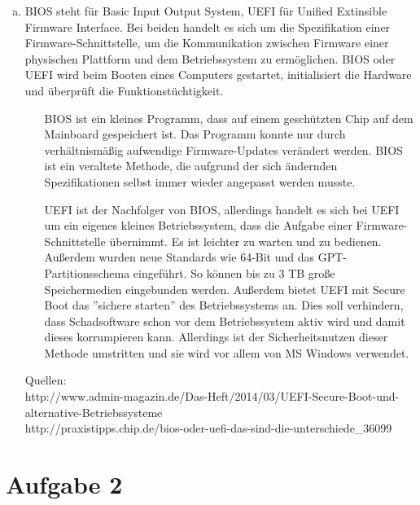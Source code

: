 \documentclass[numbers=noendperiod]{scrartcl}
\begin{document}
\begin{enumerate}[a)]
	\item BIOS steht für Basic Input Output System, UEFI für Unified Extinsible Firmware Interface. 	 Bei beiden handelt es sich um die Spezifikation einer Firmware-Schnittstelle, um die Kommunikation zwischen Firmware einer physischen Plattform und dem Betriebssystem zu ermöglichen. BIOS oder UEFI wird beim Booten eines Computers gestartet, initialisiert die Hardware und überprüft die Funktionstüchtigkeit.
	\begin{enumerate}
		\item[BIOS] ist ein kleines Programm, dass auf einem geschützten Chip auf dem Mainboard gespeichert ist. Das Programm konnte nur durch verhältnismäßig aufwendige Firmware-Updates verändert werden. BIOS ist ein veraltete Methode, die aufgrund der sich ändernden Spezifikationen selbst immer wieder angepasst werden musste.
		\item[UEFI] ist der Nachfolger von BIOS, allerdings handelt es sich bei UEFI um ein eigenes kleines Betriebssystem, dass die Aufgabe einer Firmware-Schnittstelle übernimmt. Es ist leichter zu warten und zu bedienen. Außerdem wurden neue Standards wie 64-Bit und das GPT-Partitionsschema eingeführt. So können bis zu 3 TB große Speichermedien eingebunden werden. Außerdem bietet UEFI mit Secure Boot das ''sichere starten'' des Betriebssystems an. Dies soll verhindern, dass Schadsoftware schon vor dem Betriebssystem aktiv wird und damit dieses korrumpieren kann. Allerdings ist der Sicherheitsnutzen dieser Methode umstritten und sie wird vor allem von MS Windows verwendet. 
	\end{enumerate}
	Quellen: \\
	http://www.admin-magazin.de/Das-Heft/2014/03/UEFI-Secure-Boot-und-alternative-Betriebssysteme \\
	http://praxistipps.chip.de/bios-oder-uefi-das-sind-die-unterschiede\_36099
	
\end{enumerate}

\section*{Aufgabe 2}
\end{document}

